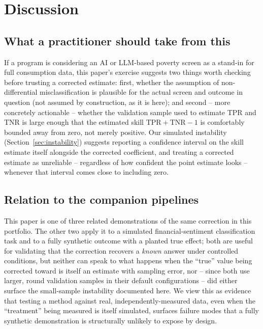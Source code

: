 \documentclass[12pt]{article}
\begin{document}
\section{Discussion}
\label{sec:discussion}

\subsection{What a practitioner should take from this}

If a program is considering an AI or LLM-based poverty screen as a stand-in for full consumption data, this paper's exercise suggests two things worth checking before trusting a corrected estimate: first, whether the assumption of non-differential misclassification is plausible for the actual screen and outcome in question (not assumed by construction, as it is here); and second -- more concretely actionable -- whether the validation sample used to estimate TPR and TNR is large enough that the estimated skill $\text{TPR}+\text{TNR}-1$ is comfortably bounded away from zero, not merely positive. Our simulated instability (Section~\ref{sec:instability}) suggests reporting a confidence interval on the skill estimate itself alongside the corrected coefficient, and treating a corrected estimate as unreliable -- regardless of how confident the point estimate looks -- whenever that interval comes close to including zero.

\subsection{Relation to the companion pipelines}

This paper is one of three related demonstrations of the same correction in this portfolio. The other two apply it to a simulated financial-sentiment classification task and to a fully synthetic outcome with a planted true effect; both are useful for validating that the correction recovers a \emph{known} answer under controlled conditions, but neither can speak to what happens when the ``true'' value being corrected toward is itself an estimate with sampling error, nor -- since both use larger, round validation samples in their default configurations -- did either surface the small-sample instability documented here. We view this as evidence that testing a method against real, independently-measured data, even when the ``treatment'' being measured is itself simulated, surfaces failure modes that a fully synthetic demonstration is structurally unlikely to expose by design.
\end{document}
